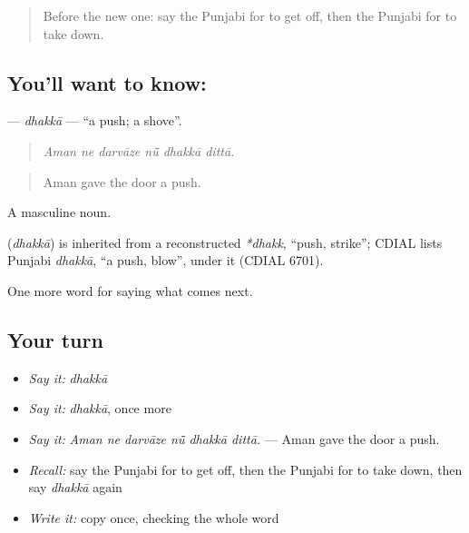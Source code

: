 \begin{quote}
Before the new one: say the Punjabi for to get off, then the Punjabi for to take down.
\end{quote}

\subsection*{You'll want to know: }
\textbf{} — \emph{dhakkā} — \textquotedblleft{}a push; a shove\textquotedblright{}.

\begin{quote}
     
\end{quote}

\begin{quote}
\emph{Aman ne darvāze nū̃ dhakkā dittā.}
\end{quote}

\begin{quote}
Aman gave the door a push.
\end{quote}

A masculine noun.

\begin{cousinweb}
\textbf{} (\emph{dhakkā}) is inherited from a reconstructed \emph{*dhakk}, \textquotedblleft{}push, strike\textquotedblright{}; CDIAL lists Punjabi \emph{dhakkā}, \textquotedblleft{}a push, blow\textquotedblright{}, under it (CDIAL 6701).
\end{cousinweb}

\begin{grammarlens}[title={What you've built}]
One more word for saying what comes next.
\end{grammarlens}

\subsection*{Your turn}
\begin{itemize}
\raggedright
  \item \emph{Say it:} \emph{dhakkā}
  \item \emph{Say it:} \emph{dhakkā}, once more
  \item \emph{Say it:} \emph{Aman ne darvāze nū̃ dhakkā dittā.} — Aman gave the door a push.
  \item \emph{Recall:} say the Punjabi for to get off, then the Punjabi for to take down, then say \emph{dhakkā} again
  \item \emph{Write it:} copy \textbf{} once, checking the whole word
\end{itemize}


